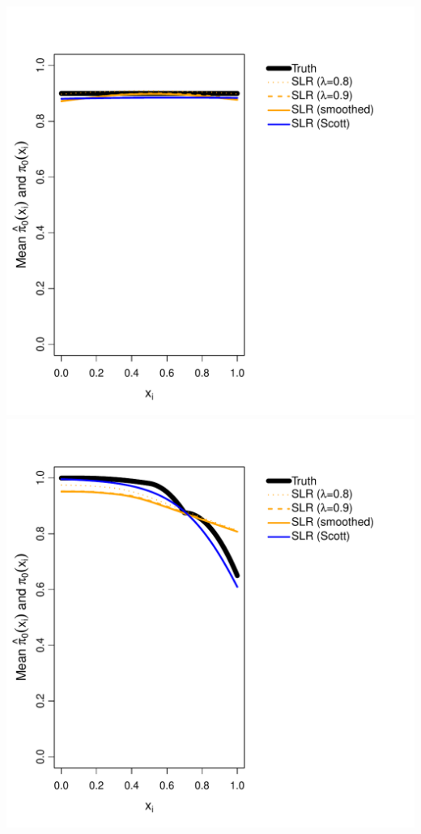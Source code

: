 \documentclass{article}\usepackage[]{graphicx}\usepackage[]{color}
\makeatletter
\def\maxwidth{ %
  \ifdim\Gin@nat@width>\linewidth
    \linewidth
  \else
    \Gin@nat@width
  \fi
}
\newenvironment{knitrout}{}{} %
\makeatother
\begin{document}
\begin{knitrout}
{\centering \includegraphics[width=\maxwidth]{Figures/unnamed-chunk-1-1} 
\includegraphics[width=\maxwidth]{Figures/unnamed-chunk-1-2} 
}
\end{knitrout}
\end{document}
